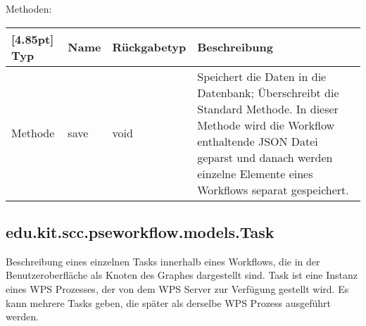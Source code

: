         
             Methoden:
	        \begin{center}
	        	\setlength\tabcolsep{5pt}
	        	\renewcommand{\arraystretch}{1.5}
	        	
	        	\begin{tabularx}{\textwidth}{|l|l|l|X|}
	        		\hline
	        		\rowcolor[gray]{0.75}[4.85pt]
	        		Typ & Name & Rückgabetyp & Beschreibung \\ \hline 
	        		Methode & save & void & Speichert die Daten in die Datenbank; Überschreibt die Standard Methode. In dieser Methode wird die Workflow enthaltende JSON Datei geparst und danach werden einzelne Elemente eines Workflows separat gespeichert. \\ 
	        		\hline
	        	\end{tabularx}
	        \end{center}
        \subsection{edu.kit.scc.pseworkflow.models.Task}	
    		Beschreibung eines einzelnen Tasks innerhalb eines Workflows, die in der Benutzeroberfläche als Knoten des Graphes dargestellt sind. Task ist eine Instanz eines WPS Prozesses, der von dem WPS Server zur Verfügung gestellt wird. Es kann mehrere Tasks geben, die später als derselbe WPS Prozess ausgeführt werden. 
    		

